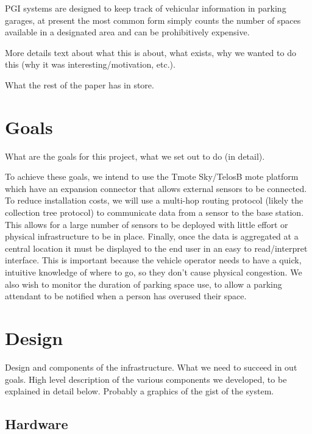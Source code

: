 \documentclass{acm_proc}
\begin{document}
\cite{sakai:pgi-toyota}
\cite{vincent:streetview}
\cite{pgi:signal-park}
\cite{pgi:streetline}
PGI systems are designed to keep track of vehicular information in parking
garages, at present the most common form simply counts the number of spaces
available in a designated area and can be prohibitively expensive.

More details text about what this is about, what exists, why we wanted to
do this (why it was interesting/motivation, etc.).

What the rest of the paper has in store.

\section{Goals}\label{sec:goals}

What are the goals for this project, what we set out to do (in detail).

To achieve these goals, we intend to use the Tmote Sky/TelosB mote platform
which have an expansion connector that allows external sensors to be
connected.
To reduce installation costs, we will use a multi-hop routing protocol
(likely
the collection tree protocol) to communicate data from a sensor to the base
station.
This allows for a large number of sensors to be deployed with little effort
or
physical infrastructure to be in place.
Finally, once the data is aggregated at a central location it must be
displayed
to the end user in an easy to read/interpret interface.
This is important because the vehicle operator needs to have a quick,
intuitive
knowledge of where to go, so they don't cause physical congestion.
We also wish to monitor the duration of parking space use, to allow a
parking
attendant to be notified when a person has overused their space.

\section{Design}\label{sec:design}

Design and components of the infrastructure.  What we need to succeed in
out goals.
High level description of the various components we developed, to be
explained in detail below.
Probably a graphics of the gist of the system.

\subsection{Hardware}
\end{document}

